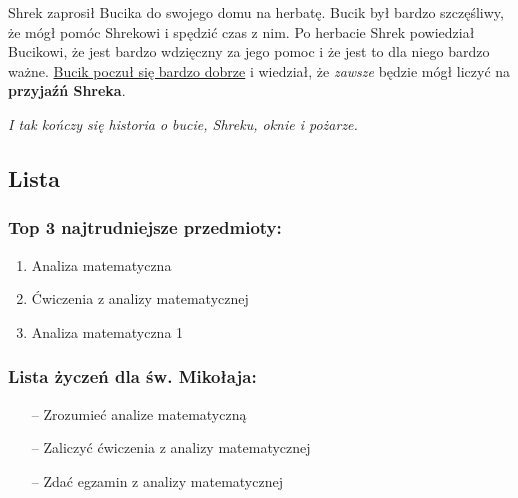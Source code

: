 Shrek zaprosił Bucika do swojego domu na herbatę. Bucik był bardzo szczęśliwy, że mógł pomóc Shrekowi i spędzić czas z nim. Po herbacie Shrek powiedział Bucikowi, że jest bardzo wdzięczny za jego pomoc i że jest to dla niego bardzo ważne.
\underline{Bucik poczuł się bardzo dobrze} i wiedział, że \textit{zawsze} będzie mógł liczyć na \textbf{przyjaźń Shreka}.

\emph{I tak kończy się historia o bucie, Shreku, oknie i pożarze.}

\subsection{Lista}

\subsubsection{Top 3 najtrudniejsze przedmioty:}
\begin{enumerate}
    \item Analiza matematyczna
    \item Ćwiczenia z analizy matematycznej
    \item Analiza matematyczna 1
\end{enumerate}

\subsubsection{Lista życzeń dla św. Mikołaja:}
\begin{itemize}
    \item[--] Zrozumieć analize matematyczną
    \item[--] Zaliczyć ćwiczenia z analizy matematycznej
    \item[--] Zdać egzamin z analizy matematycznej
\end{itemize}
%
